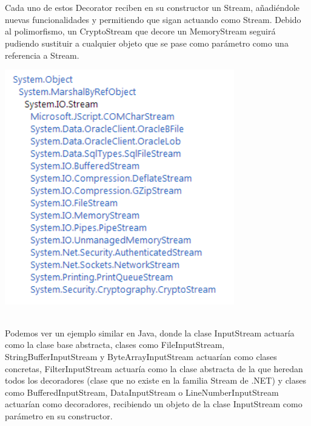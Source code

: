 \begin{flushleft}
\textbf{}\\ 
\textbf{}\\ 
Cada uno de estos Decorator reciben en su constructor un Stream, añadiéndole nuevas funcionalidades y permitiendo que sigan actuando como Stream. Debido al polimorfismo, un CryptoStream que decore un MemoryStream seguirá pudiendo sustituir a cualquier objeto que se pase como parámetro como una referencia a Stream.
\textbf{}\\ 
\begin{center}
	\includegraphics[width=10cm]{./Imagenes/decorator21} 

	\end{center}
\textbf{}\\ 


Podemos ver un ejemplo similar en Java, donde la clase InputStream actuaría como la clase base abstracta, clases como FileInputStream, StringBufferInputStream y ByteArrayInputStream actuarían como clases concretas, FilterInputStream actuaría como la clase abstracta de la que heredan todos los decoradores (clase que no existe en la familia Stream de .NET) y clases como BufferedInputStream, DataInputStream o LineNumberInputStream actuarían como decoradores, recibiendo un objeto de la clase InputStream como parámetro en su constructor.






\end{flushleft}